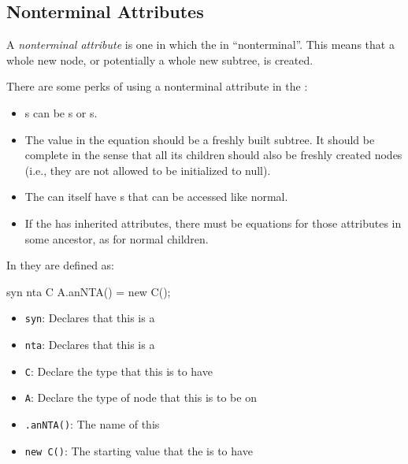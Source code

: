 \subsection{Nonterminal Attributes}\label{subsec:Nonterminal_Attributes}
\begin{definition}\label{def:Nonterminal_Attribute}
  A \emph{nonterminal attribute} is one in which the  in ``nonterminal''.
  This means that a whole new node, or potentially a whole new subtree, is created.

  There are some perks of using a nonterminal attribute in the :
  \begin{itemize}[noitemsep]
  \item {}s can be s or s.
  \item The value in the equation should be a freshly built  subtree.
    It should be complete in the sense that all its children should also be freshly created nodes (i.e., they are not allowed to be initialized to null).
  \item The  can itself have s that can be accessed like normal.
  \item If the  has inherited attributes, there must be equations for those attributes in some ancestor, as for normal children.

  \end{itemize}
  In \JastAdd{} they are defined as:
\begin{javasource}
  syn nta C A.anNTA() = new C();
\end{javasource}
  \begin{itemize}[noitemsep]
  \item \texttt{syn}: Declares that this  is a 
  \item \texttt{nta}: Declares that this  is a 
  \item \texttt{C}: Declare the type that this  is to have
  \item \texttt{A}: Declare the type of  node that this  is to be on
  \item \texttt{.anNTA()}: The name of this 
  \item \texttt{new C()}: The starting value that the  is to have
  \end{itemize}
\end{definition}

